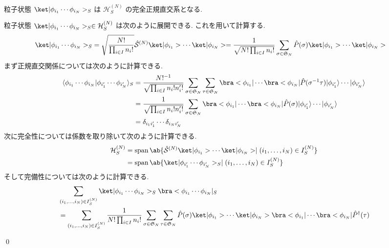 \documentclass[uplatex,dvipdfmx,a4paper,11pt]{jlreq}
\makeatletter
\DeclareMathOperator{\Span}{span}
\newcommand{\HH}{\mathcal{H}}
\renewcommand{\SS}{\mathfrak{S}}
\renewcommand{\S}{\mathcal{S}}
\numberwithin{equation}{section}
\theoremstyle{definition}
\renewenvironment{proof}[1][\proofname]{\par
  \normalfont
  \topsep6\p@\@plus6\p@ \trivlist
  \item[\hskip\labelsep{\bfseries #1}\@addpunct{\bfseries}]\ignorespaces\quad\par
}{
  \qed\endtrivlist\@endpefalse
}
\renewcommand\proofname{証明}
\makeatother
\begin{document}
\begin{proposition}[Q21-20(iv)(v)(vi)]
  粒子状態 $\ket|\phi_{i_1}\cdots\phi_{i_N}>_S$ は $\HH_S^{(N)}$ の完全正規直交系となる.
\end{proposition}
\begin{proof}
  粒子状態 $\ket|\phi_{i_1}\cdots\phi_{i_N}>_S\in\HH_S^{(N)}$ は次のように展開できる. これを用いて計算する.
  \begin{align}
    \ket|\phi_{i_1}\cdots\phi_{i_N}>_S & = \sqrt{\frac{N!}{\prod_{i\in I}n_i!}}\hat{\S}^{(N)}\ket|\phi_{i_1}>\cdots\ket|\phi_{i_N}> = \frac{1}{\sqrt{N!\prod_{i\in I}n_i!}}\sum_{\sigma\in\SS_N}\hat{P}(\sigma)\ket|\phi_{i_1}>\cdots\ket|\phi_{i_N}>
  \end{align}
  まず正規直交関係については次のように計算できる.
  \begin{align}
    \langle\phi_{i_1}\cdots\phi_{i_N}|\phi_{i_1'}\cdots\phi_{i_N'}\rangle_S & = \frac{N!^{-1}}{\sqrt{\prod_{i\in I}n_i!n_i'!}}\sum_{\sigma\in\SS_N}\sum_{\tau\in\SS_N}\bra<\phi_{i_1}|\cdots\bra<\phi_{i_N}|\hat{P}(\sigma^{-1}\tau)|\phi_{i_1'}\rangle\cdots|\phi_{i_N'}\rangle \\
                                                                            & = \frac{1}{\sqrt{\prod_{i\in I}n_i!n_i'!}}\sum_{\sigma\in\SS_N}\bra<\phi_{i_1}|\cdots\bra<\phi_{i_N}|\hat{P}(\sigma)|\phi_{i_1'}\rangle\cdots|\phi_{i_N'}\rangle                                   \\
                                                                            & = \delta_{i_1i_1'}\cdots\delta_{i_Ni_N'}
  \end{align}
  次に完全性については係数を取り除いて次のように計算できる.
  \begin{align}
    \HH_S^{(N)} & = \Span\ab\{\hat{\S}^{(N)}\ket|\phi_{i_1}>\cdots\ket|\phi_{i_N}> \mid (i_1,\ldots,i_N)\in I_S^{(N)} \} \\
                & = \Span\ab\{\ket|\phi_{i_1'}\cdots\phi_{i_N'}>_S \mid (i_1,\ldots,i_N)\in I_S^{(N)} \}
  \end{align}
  そして完備性については次のように計算できる.
  \begin{align}
     & \sum_{(i_1,\ldots,i_N)\in I_S^{(N)}}\ket|\phi_{i_1}\cdots\phi_{i_N}>_S\bra<\phi_{i_1}\cdots\phi_{i_N}|_S                                                                                                                     \\
     & = \sum_{(i_1,\ldots,i_N)\in I_S^{(N)}}\frac{1}{N!\prod_{i\in I}n_i!}\sum_{\sigma\in\SS_N}\sum_{\tau\in\SS_N}\hat{P}(\sigma)\ket|\phi_{i_1}>\cdots\ket|\phi_{i_N}>\bra<\phi_{i_1}|\cdots\bra<\phi_{i_N}|\hat{P}^\dagger(\tau) \\

\end{align}
\end{proof}
\end{document}
